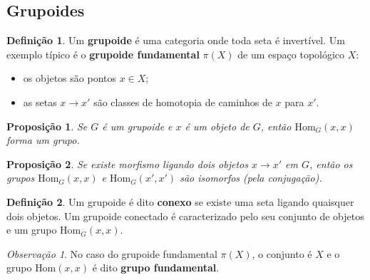 \documentclass{article}
\theoremstyle{plain}                    %
\newtheorem*{proposition}{Proposição}
\theoremstyle{definition}
\newtheorem*{definition}{Definição}
\theoremstyle{remark}
\newtheorem*{remark}{Observação}
\begin{document}
\begin{adendo}

\subsection*{Grupoides}

\begin{definition}
Um \textbf{grupoide} é uma categoria onde toda seta é invertível.  
Um exemplo típico é o \textbf{grupoide fundamental} $\pi(X)$ de um espaço topológico $X$:  
\begin{itemize}
    \item os objetos são pontos $x \in X$;
    \item as setas $x \to x'$ são classes de homotopia de caminhos de $x$ para $x'$.
\end{itemize}
\end{definition}

\begin{proposition}
Se $G$ é um grupoide e $x$ é um objeto de $G$, então $\text{Hom}_G(x,x)$ forma um grupo.
\end{proposition}

\begin{proposition}
Se existe morfismo ligando dois objetos $x \to x'$ em $G$, então os grupos $\text{Hom}_G(x,x)$ e $\text{Hom}_G(x',x')$ são isomorfos (pela conjugação).
\end{proposition}

\begin{definition}
Um grupoide é dito \textbf{conexo} se existe uma seta ligando quaisquer dois objetos.  
Um grupoide conectado é caracterizado pelo seu conjunto de objetos e um grupo $\text{Hom}_G(x,x)$.
\end{definition}

\begin{remark}
No caso do grupoide fundamental $\pi(X)$, o conjunto é $X$ e o grupo $\text{Hom}(x,x)$ é dito \textbf{grupo fundamental}.
\end{remark}

\end{adendo}
\end{document}
